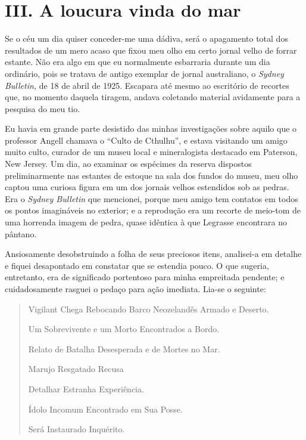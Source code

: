 \chapter{III. A loucura vinda do mar}

Se o céu um dia quiser conceder-me uma dádiva, será o apagamento total
dos resultados de um mero acaso que fixou meu olho em certo jornal velho
de forrar estante. Não era algo em que eu normalmente esbarraria durante
um dia ordinário, pois se tratava de antigo exemplar de jornal
australiano, o \emph{Sydney Bulletin,} de 18 de abril de 1925. Escapara
até mesmo ao escritório de recortes que, no momento daquela tiragem,
andava coletando material avidamente para a pesquisa do meu tio.

Eu havia em grande parte desistido das minhas investigações sobre aquilo
que o professor Angell chamava o ``Culto de Cthulhu'', e estava
visitando um amigo muito culto, curador de um museu local e
mineralogista destacado em Paterson, New Jersey. Um dia, ao examinar os
espécimes da reserva dispostos preliminarmente nas estantes de estoque
na sala dos fundos do museu, meu olho captou uma curiosa figura em um
dos jornais velhos estendidos sob as pedras. Era o \emph{Sydney
Bulletin} que mencionei, porque meu amigo tem contatos em todos os
pontos imagináveis no exterior; e a reprodução era um recorte de
meio-tom de uma horrenda imagem de pedra, quase idêntica à que Legrasse
encontrara no pântano.

Ansiosamente desobstruindo a folha de seus preciosos itens, analisei-a
em detalhe e fiquei desapontado em constatar que se estendia pouco. O
que sugeria, entretanto, era de significado portentoso para minha
empreitada pendente; e cuidadosamente rasguei o pedaço para ação
imediata. Lia-se o seguinte:

\begin{quote}

Vigilant Chega Rebocando Barco Neozelandês Armado e Deserto.

Um Sobrevivente e um Morto Encontrados a Bordo.

Relato de Batalha Desesperada e de Mortes no Mar.

Marujo Resgatado Recusa

Detalhar Estranha Experiência.

Ídolo Incomum Encontrado em Sua Posse.

Será Instaurado Inquérito.
\end{quote}

